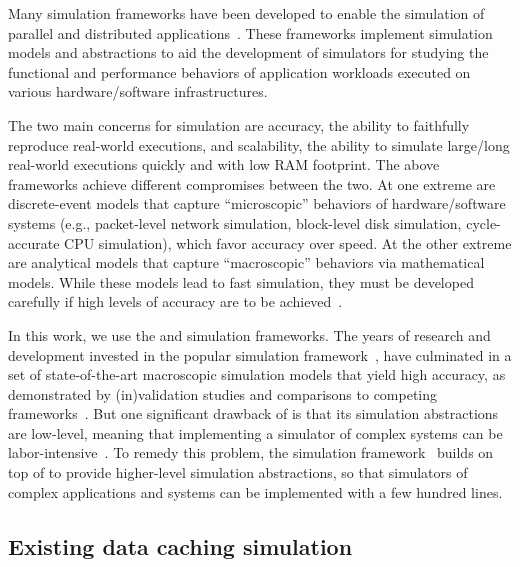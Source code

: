 Many simulation frameworks have been developed to enable the
simulation of parallel and distributed
applications~\cite{optorsim, gridsim, groudsim, cloudsim,
nunez2012simcan,nunez2012icancloud, mdcsim, dissect_cf,
cloudnetsimplusplus, fognetsimplusplus, casanova2014simgrid,
ROSS, casanova2020fgcs}. These frameworks implement simulation
models and abstractions to aid the development of simulators
for studying the functional and performance behaviors of
application workloads executed on various hardware/software
infrastructures. 

The two main concerns for simulation are accuracy,
the ability to faithfully reproduce real-world executions, and
scalability, the ability to simulate large/long real-world
executions quickly and with low RAM footprint. The above
frameworks achieve different compromises between the two.  At
one extreme are discrete-event models that capture
``microscopic'' behaviors of hardware/software systems (e.g.,
packet-level network simulation, block-level disk simulation,
cycle-accurate CPU simulation), which favor accuracy over
speed.  At the other extreme are analytical models that capture
``macroscopic'' behaviors via mathematical models.  While these
models lead to fast simulation, they must be developed
carefully if high levels of accuracy are to be
achieved~\cite{velhoTOMACS2013}. 

In this  work, we use the \simgrid and \wrench simulation
frameworks.  The years of research and development invested in
the popular \simgrid simulation framework~\cite{casanova2014simgrid}, have
culminated in a set of state-of-the-art macroscopic simulation
models that yield high accuracy, as demonstrated by
(in)validation studies and comparisons to competing
frameworks~\cite{smpi_validity, velhoTOMACS2013, simutool_09,
nstools_07, lebre2015, pouilloux:hal-01197274,
smpi_tpds2017,  7885814, 8048921, 7384330}.  But one
significant drawback of \simgrid is that its simulation
abstractions are low-level, meaning that implementing a
simulator of complex systems can be
labor-intensive~\cite{kecskemeti_2014}. To remedy this problem,
the \wrench simulation framework~\cite{casanova2020fgcs}
builds on top of \simgrid to provide higher-level simulation
abstractions, so that simulators of complex applications and
systems can be implemented with a few hundred lines.

\subsection{Existing data caching simulation}

